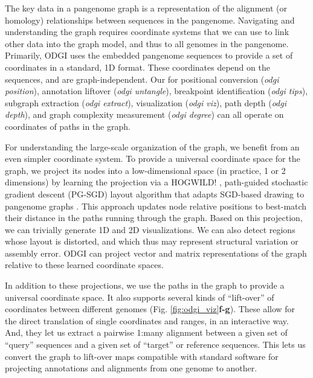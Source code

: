 \documentclass{bioinfo}
\begin{document}
The key data in a pangenome graph is a representation of the alignment (or homology) relationships between sequences in the pangenome.
Navigating and understanding the graph requires coordinate systems that we can use to link other data into the graph model, and thus to all genomes in the pangenome.
Primarily, ODGI uses the embedded pangenome sequences to provide a set of coordinates in a standard, 1D format.
These coordinates depend on the sequences, and are graph-independent.
Our for positional conversion (\textit{odgi position}), annotation liftover (\textit{odgi untangle}), breakpoint identification (\textit{odgi tips}), subgraph extraction (\textit{odgi extract}), visualization (\textit{odgi viz}), path depth (\textit{odgi depth}), and graph complexity measurement (\textit{odgi degree}) can all operate on coordinates of paths in the graph.

For understanding the large-scale organization of the graph, we benefit from an even simpler coordinate system.
To provide a universal coordinate space for the graph, we project its nodes into a low-dimensional space (in practice, 1 or 2 dimensions) by learning the projection via a HOGWILD! \citep{niu2011hogwild}, path-guided stochastic gradient descent (PG-SGD) layout algorithm that adapts SGD-based drawing to pangenome graphs \citep{zheng2018graph}.
This approach updates node relative positions to best-match their distance in the paths running through the graph.
Based on this projection, we can trivially generate 1D and 2D visualizations.
We can also detect regions whose layout is distorted, and which thus may represent structural variation or assembly error.
ODGI can project vector and matrix representations of the graph relative to these learned coordinate spaces.

In addition to these projections, we use the paths in the graph to provide a universal coordinate space.
It also supports several kinds of ``lift-over'' of coordinates between different genomes (Fig. \ref{fig:odgi_viz}\textbf{f-g}).
These allow for the direct translation of single coordinates and ranges, in an interactive way.
And, they let us extract a pairwise 1:many alignment between a given set of ``query'' sequences and a given set of ``target'' or reference sequences.
This lets us convert the graph to lift-over maps compatible with standard software for projecting annotations and alignments from one genome to another.



\end{document}
